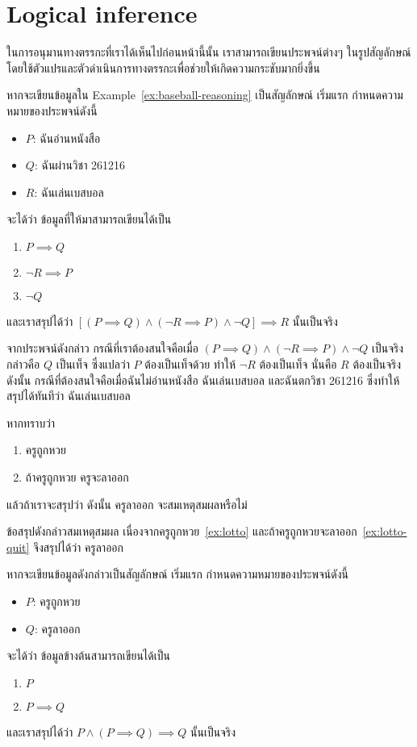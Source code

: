 \section{Logical inference}
ในการอนุมานทางตรรกะที่เราได้เห็นไปก่อนหน้านี้นั้น เราสามารถเขียนประพจน์ต่างๆ ในรูปสัญลักษณ์ โดยใช้ตัวแปรและตัวดำเนินการทางตรรกะเพื่อช่วยให้เกิดความกระชับมากยิ่งขึ้น

\begin{example}
หากจะเขียนข้อมูลใน Example~\ref{ex:baseball-reasoning} เป็นสัญลักษณ์ เริ่มแรก กำหนดความหมายของประพจน์ดังนี้
\begin{itemize}
\item $P$: ฉันอ่านหนังสือ
\item $Q$: ฉันผ่านวิชา 261216
\item $R$: ฉันเล่นเบสบอล
\end{itemize}
จะได้ว่า ข้อมูลที่ให้มาสามารถเขียนได้เป็น
\begin{enumerate}
\item $P\implies Q$
\item $\neg R\implies P$
\item $\neg Q$
\end{enumerate}
และเราสรุปได้ว่า $[(P\implies Q)\wedge(\neg R\implies P)\wedge\neg Q]\implies R$ นั้นเป็นจริง

จากประพจน์ดังกล่าว กรณีที่เราต้องสนใจคือเมื่อ $(P\implies Q)\wedge(\neg R\implies P)\wedge\neg Q$ เป็นจริง กล่าวคือ $Q$ เป็นเท็จ ซึ่งแปลว่า $P$ ต้องเป็นเท็จด้วย ทำให้ $\neg R$ ต้องเป็นเท็จ นั่นคือ $R$ ต้องเป็นจริง ดังนั้น กรณีที่ต้องสนใจคือเมื่อฉันไม่อ่านหนังสือ ฉันเล่นเบสบอล และฉันตกวิชา 261216 ซึ่งทำให้สรุปได้ทันทีว่า ฉันเล่นเบสบอล
\end{example}

\begin{example}\label{ex:modus-ponens}
หากทราบว่า
\begin{enumerate}[ref=(\arabic*)]
\item\label{ex:lotto} ครูถูกหวย
\item\label{ex:lotto-quit} ถ้าครูถูกหวย ครูจะลาออก
\end{enumerate}
แล้วถ้าเราจะสรุปว่า ดังนั้น ครูลาออก จะสมเหตุสมผลหรือไม่
\begin{pf}
ข้อสรุปดังกล่าวสมเหตุสมผล เนื่องจากครูถูกหวย~\ref{ex:lotto} และถ้าครูถูกหวยจะลาออก~\ref{ex:lotto-quit} จึงสรุปได้ว่า ครูลาออก
\end{pf}

หากจะเขียนข้อมูลดังกล่าวเป็นสัญลักษณ์ เริ่มแรก กำหนดความหมายของประพจน์ดังนี้
\begin{itemize}
\item $P$: ครูถูกหวย
\item $Q$: ครูลาออก
\end{itemize}
จะได้ว่า ข้อมูลข้างต้นสามารถเขียนได้เป็น
\begin{enumerate}
\item $P$
\item $P\implies Q$
\end{enumerate}
และเราสรุปได้ว่า $P\wedge(P\implies Q)\implies Q$ นั้นเป็นจริง
\end{example}

